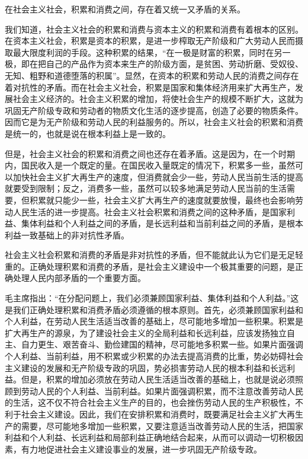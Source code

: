 \documentclass{book}
\begin{document}
在社会主义社会，积累和消费之间，存在着又统一又矛盾的关系。

我们知道，社会主义社会的积累和消费与资本主义的积累和消费有着根本的区别。在资本主义社会，积累是资本的积累，是进一步榨取无产阶级和广大劳动人民而摄取最大限度利润的手段。这种积累的结果，“在一极是财富的积累，同时在另一极，即在把自己的产品作为资本来生产的阶级方面，是贫困、劳动折磨、受奴役、无知、粗野和道德堕落的积属”。显然，在资本的积累和劳动人民的消费之间存在着对抗性的矛盾。而在社会主义社会，积累是国家和集体经济用来扩大再生产，发展社会主义经济的。社会主义积累的增加，将使社会生产的规模不断扩大，这就为巩固无产阶级专政和劳动者的物质文化生活的逐步提高，创造了必要的物质条件。因而它是为无产阶级和劳动人民的利益服务的。所以，社会主义社会的积累和消费是统一的，也就是说在根本利益上是一致的。

但是，社会主义社会的积累和消费之间也还存在着矛盾。这是因为，在一个时期内，国民收入是一个既定的量。在国民收入量既定的情况下，积累多一些，虽然可以加快社会主义扩大再生产的速度，但消费就会少一些，劳动人民当前生活的提高就要受到限制；反之，消费多一些，虽然可以较多地满足劳动人民当前的生活需要，但积累就只能少一些，社会主义扩大再生产的速度就要放慢，最终也会影响劳动人民生活的进一步提高。社会主义社会积累和消费之间的这种矛盾，是国家利益、集体利益和个人利益之间的矛盾，是长远利益和当前利益之间的矛盾，是根本利益一致基础上的非对抗性矛盾。

社会主义社会积累和消费的矛盾是非对抗性的矛盾，但不能就此认为它们是无足轻重的。正确处理积累和消费的矛盾，是社会主义建设中一个极其重要的问题，是正确处理人民内部矛盾的一个重要方面。

毛主席指出：“在分配问题上，我们必须兼顾国家利益、集体利益和个人利益。”这是我们正确处理积累和消费矛盾必须遵循的根本原则。首先，必须兼顾国家利益和个人利益，在劳动人民生活适当改善的基础上，尽可能地多增加一些积果。积累是扩大再生产的源泉，为了建设社会主义的全局利益和长远利益，应该发扬独立自主、自力更生、艰苦奋斗、勤俭建国的精神，尽可能地多积累一些。如果片面强调个人利益、当前利益，用不积累或少积累的办法去提高消费的比重，势必妨碍社会主义建设的发展和无产阶级专政的巩固，势必损害劳动人民的根本利益和长远利益。但是，积累的增加必须放在劳动人民生活适当改善的基础上，也就是说必须照顾到劳动人民的个人利益、当前利益。如果片面强调积累，而不注意改善劳动人民的生活，这不仅不符合社会主义生产的目的，也会挫伤劳动人民的生产积极性，不利于社会主义建设。因此，我们在安排积累和消费时，既要满足社会主义扩大再生产的需要，尽可能地多增加一些积累，又要注意适当改善劳动人民的生活，把国家利益和个人利益、长远利益和局部利益正确地结合起来，从而可以调动一切积极因素，有力地促进社会主义建设事业的发展，进一步巩固无产阶级专政。
\end{document}
